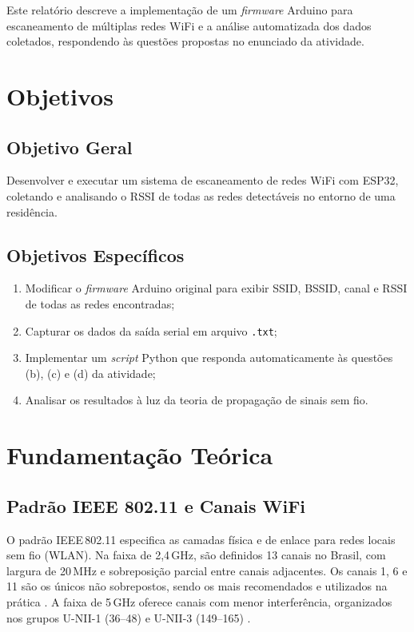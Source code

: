 \documentclass[
  12pt,
  a4paper,
  oneside,
  brazil,
  chapter=TITLE,
  section=TITLE,
]{abntex2}
\begin{document}
Este relatório descreve a implementação de um \textit{firmware} Arduino para
escaneamento de múltiplas redes WiFi e a análise automatizada dos dados
coletados, respondendo às questões propostas no enunciado da atividade.

\chapter{Objetivos}

\section{Objetivo Geral}

Desenvolver e executar um sistema de escaneamento de redes WiFi com ESP32,
coletando e analisando o RSSI de todas as redes detectáveis no entorno de
uma residência.

\section{Objetivos Específicos}

\begin{enumerate}[label=\alph*)]
  \item Modificar o \textit{firmware} Arduino original para exibir SSID,
        BSSID, canal e RSSI de todas as redes encontradas;
  \item Capturar os dados da saída serial em arquivo \texttt{.txt};
  \item Implementar um \textit{script} Python que responda automaticamente
        às questões (b), (c) e (d) da atividade;
  \item Analisar os resultados à luz da teoria de propagação de sinais
        sem fio.
\end{enumerate}

\chapter{Fundamentação Teórica}

\section{Padrão IEEE 802.11 e Canais WiFi}

O padrão IEEE\,802.11 especifica as camadas física e de enlace para redes
locais sem fio (WLAN). Na faixa de 2,4\,GHz, são definidos 13 canais no Brasil,
com largura de 20\,MHz e sobreposição parcial entre canais adjacentes. Os
canais 1, 6 e 11 são os únicos não sobrepostos, sendo os mais recomendados e
utilizados na prática \cite{gast2005}. A faixa de 5\,GHz oferece canais com
menor interferência, organizados nos grupos U-NII-1 (36--48) e U-NII-3
(149--165) \cite{perahia2013}.
\end{document}
